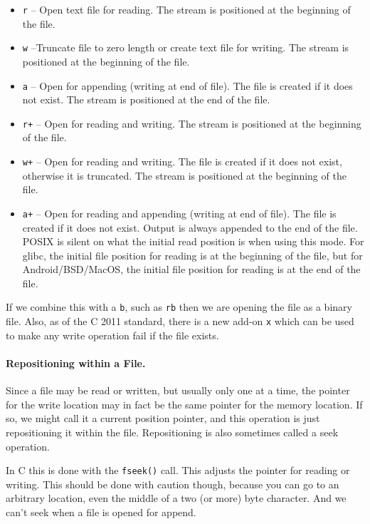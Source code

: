 \begin{itemize}
	\item \texttt{r} -- Open text file for reading. The stream is positioned at the beginning of the file.
	\item \texttt{w} --Truncate file to zero length or create text file for writing. The stream is positioned at the beginning of the file.
	\item \texttt{a} -- Open for appending (writing at end of file). The file is created if it does not exist. The stream is positioned at the end of the file.
	\item \texttt{r+} -- Open for reading and writing. The stream is positioned at the beginning of the file.
	\item \texttt{w+} -- Open for reading and writing. The file is created if it does not exist, otherwise it is truncated. The stream is positioned at the beginning of the file.
	\item \texttt{a+} -- Open for reading and appending (writing at end of file). The file is created if it does not exist. Output is always appended to the end of the file. POSIX is silent on what the initial read position is when using this mode. For glibc, the initial file position for reading is at the beginning of the file, but for Android/BSD/MacOS, the initial file position for reading is at the end of the file.
\end{itemize}

If we combine this with a \texttt{b}, such as \texttt{rb} then we are opening the file as a binary file. Also, as of the C 2011 standard, there is a new add-on \texttt{x} which can be used to make any write operation fail if the file exists.

\paragraph{Repositioning within a File.} Since a file may be read or written, but usually only one at a time, the pointer for the write location may in fact be the same pointer for the memory location. If so, we might call it a current position pointer, and this operation is just repositioning it within the file. Repositioning is also sometimes called a seek operation.

In C this is done with the \texttt{fseek()} call. This adjusts the pointer for reading or writing. This should be done with caution though, because you can go to an arbitrary location, even the middle of a two (or more) byte character. And we can't seek when a file is opened for append.

